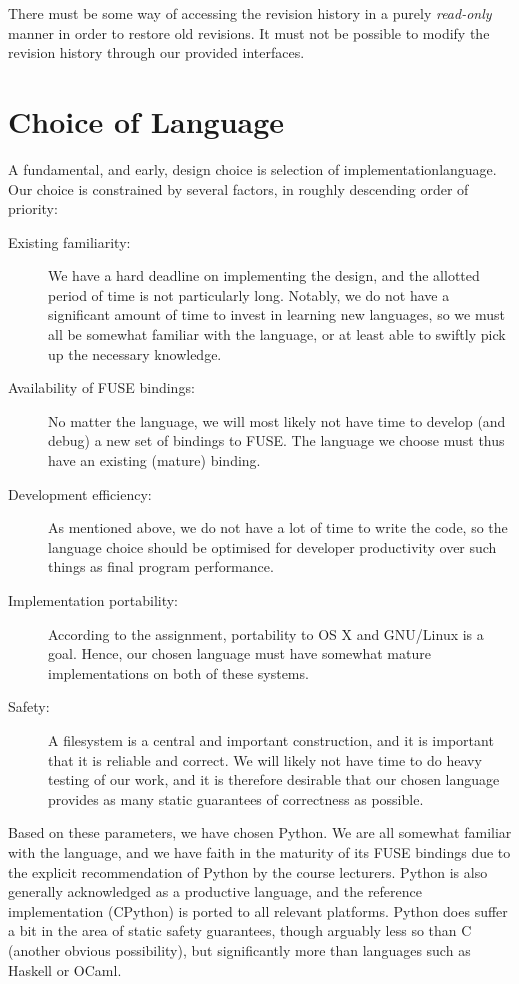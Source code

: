 \documentclass[12pt]{article}
\begin{document}
There must be some way of accessing the revision history in a purely
\textit{read-only} manner in order to restore old revisions.  It must
not be possible to modify the revision history through our provided
interfaces.
 
\section{Choice of Language}
 
A fundamental, and early, design choice is selection of implementationlanguage. Our choice is constrained by several factors, in roughly
descending order of priority:
 
\begin{description}
\item[Existing familiarity: ] We have a hard deadline on
  implementing the design, and the allotted period of time is not
  particularly long. Notably, we do not have a significant amount of
time to invest in learning new languages, so we must all be somewhat  familiar with the language, or at least able to swiftly pick up the
  necessary knowledge.
\item[Availability of FUSE bindings: ] No matter the language, we will  most likely not have time to develop (and debug) a new set of
  bindings to FUSE. The language we choose must thus have an existing
  (mature) binding.
\item[Development efficiency: ] As mentioned above, we do not have a
  lot of time to write the code, so the language choice should be
  optimised for developer productivity over such things as final
  program performance.
\item[Implementation portability: ] According to the assignment,
  portability to OS X and GNU/Linux is a goal. Hence, our chosen
  language must have somewhat mature implementations on both of these
  systems.
\item[Safety: ] A filesystem is a central and important construction,
  and it is important that it is reliable and correct. We will likely
  not have time to do heavy testing of our work, and it is therefore
  desirable that our chosen language provides as many static
  guarantees of correctness as possible.
\end{description}
 
Based on these parameters, we have chosen Python. We are all somewhat
familiar with the language, and we have faith in the maturity of its
FUSE bindings due to the explicit recommendation of Python by the
course lecturers. Python is also generally acknowledged as a
productive language, and the reference implementation (CPython) is
ported to all relevant platforms. Python does suffer a bit in the
area of static safety guarantees, though arguably less so than C
(another obvious possibility), but significantly more than languages
such as Haskell or OCaml.
 
\end{document}
